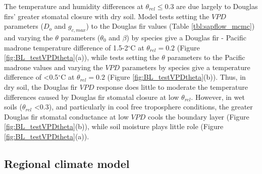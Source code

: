 The temperature and humidity differences at $\theta_{rel} \le 0.3$ are due largely to Douglas firs' greater stomatal closure with dry soil.  Model tests setting the $VPD$ parameters ($D_o$ and $g_{c,max}$) to the Douglas fir values (Table \ref{tbl:sapflow_mcmc}) and varying the $\theta$ parameters ($\theta_0$ and $\beta$) by species give a Douglas fir - Pacific madrone temperature difference of 1.5-2$^\circ$C at $\theta_{rel} = 0.2$ (Figure \ref{fig:BL_testVPDtheta}(a)), while tests setting the $\theta$ parameters to the Pacific madrone values and varying the $VPD$ parameters by species give a temperature difference of \textless 0.5$^\circ$C at $\theta_{rel} = 0.2$ (Figure \ref{fig:BL_testVPDtheta}(b)).  Thus, in dry soil, the Douglas fir $VPD$ response does little to moderate the temperature differences caused by Douglas fir stomatal closure at low $\theta_{rel}$.  However, in wet soils ($\theta_{rel}$ \textless $0.3$), and particularly in cool free troposphere conditions, the greater Douglas fir stomatal conductance at low $VPD$ cools the boundary layer (Figure \ref{fig:BL_testVPDtheta}(b)), while soil moisture plays little role (Figure \ref{fig:BL_testVPDtheta}(a)).


\subsection{Regional climate model}

